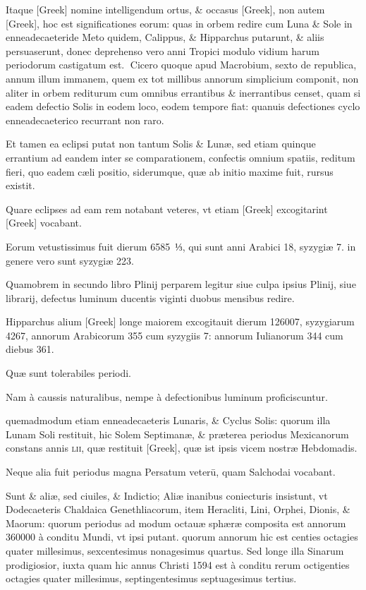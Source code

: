 \begin{parnumbers}

Itaque \textgreek{[Greek]} nomine intelligendum ortus, \& occasus \textgreek{[Greek]},  non autem \textgreek{[Greek]}, hoc est significationes eorum: quas in orbem redire cum Luna \& Sole in enneadecaeteride Meto quidem, Calippus, \& Hipparchus putarunt, \& aliis persuaserunt, donec deprehenso vero anni Tropici modulo vidium harum periodorum castigatum est.
Cicero quoque apud Macrobium, sexto de republica, annum illum immanem, quem ex tot millibus annorum simplicium componit, non aliter in orbem rediturum cum omnibus errantibus \& inerrantibus censet, quam si eadem defectio Solis in eodem loco, eodem tempore fiat: quanuis defectiones cyclo enneadecaeterico recurrant non raro.

Et tamen ea eclipsi putat non tantum Solis \& Lunæ, sed etiam quinque errantium ad eandem  inter se comparationem, confectis omnium spatiis, reditum fieri, quo eadem cæli positio, siderumque, quæ ab initio maxime fuit, rursus existit.

Quare eclipses ad eam rem notabant veteres, vt etiam \textgreek{[Greek]} excogitarint \textgreek{[Greek]} vocabant.

Eorum vetustissimus fuit dierum 6585 ⅓, qui sunt anni Arabici 18, syzygiæ 7. in genere vero sunt syzygiæ 223.

Quamobrem in secundo libro Plinij perparem legitur siue culpa ipsius Plinij, siue librarij, defectus luminum ducentis viginti duobus mensibus redire.

Hipparchus alium \textgreek{[Greek]} longe maiorem excogitauit dierum 126007, syzygiarum 4267, annorum Arabicorum 355 cum syzygiis 7: annorum Iulianorum 344 cum diebus 361.

Quæ sunt tolerabiles periodi.

Nam à caussis naturalibus,  nempe à defectionibus luminum proficiscuntur.

quemadmodum etiam enneadecaeteris Lunaris, \& Cyclus Solis: quorum illa Lunam Soli restituit, hic Solem Septimanæ, \& præterea periodus Mexicanorum constans annis \textsc{lii}, quæ restituit \textgreek{[Greek]}, quæ ist ipsis vicem nostræ Hebdomadis.

Neque alia fuit periodus magna Persatum veterū, quam Salchodai vocabant.

Sunt \& aliæ, sed ciuiles, \& Indictio; Aliæ inanibus coniecturis insistunt, vt Dodecaeteris Chaldaica Genethliacorum, item Heracliti, Lini, Orphei, Dionis, \& Maorum: quorum periodus ad modum octauæ sphæræ composita est annorum 360000 à conditu Mundi, vt ipsi putant. quorum annorum hic est centies octagies quater millesimus, sexcentesimus nonagesimus quartus.  Sed longe illa Sinarum prodigiosior, iuxta quam hic annus Christi 1594 est à conditu rerum octigenties octagies quater millesimus, septingentesimus septuagesimus tertius.


\end{parnumbers}
